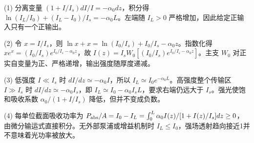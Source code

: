 (1) 分离变量 \((1+I/I_s)dI/I=-\alpha_0dz\)，积分得 \(\boxed{\ln(I_L/I_0)+(I_L-I_0)/I_s=-\alpha_0L}\)。左端随 \(I_L>0\) 严格增加，因此给定正输入只有一个正输出。

(2) 令 \(x=I/I_s\)，则 \(\ln x+x=\ln(I_0/I_s)+I_0/I_s-\alpha_0z\)。指数化得 \(xe^x=(I_0/I_s)e^{I_0/I_s-\alpha_0z}\)，故 \(\boxed{I(z)=I_sW_0[(I_0/I_s)e^{I_0/I_s-\alpha_0z}]}\)。主支 \(W_0\) 对正实自变量为正、严格递增，输出强度随厚度递减。

(3) 低强度 \(I\ll I_s\) 时 \(dI/dz\simeq-\alpha_0I\)，所以 \(I_L\simeq I_0e^{-\alpha_0L}\)。高强度整个传输区 \(I\gg I_s\) 时 \(dI/dz\simeq-\alpha_0I_s\)，即 \(I_L\simeq I_0-\alpha_0I_sL\)，要求右端仍远大于 \(I_s\)。强光使饱和吸收系数 \(\alpha_0/(1+I/I_s)\) 降低，但并不变成负数。

(4) 每单位截面吸收功率为 \(P_{\rm abs}/A=I_0-I_L=\int_0^L\alpha_0I(z)/[1+I(z)/I_s]dz\ge0\)，由微分输运式直接积分。无外部泵浦或增益机制时 \(I_L\le I_0\)，强场透射趋向接近1并不意味着光功率被放大。
